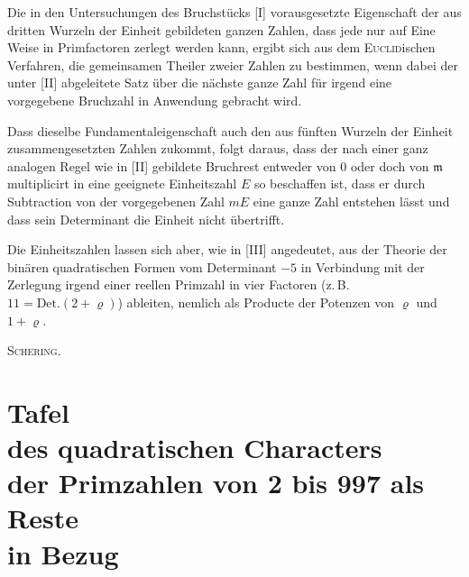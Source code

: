 \documentclass[10pt,a4paper]{article}
\begin{document}
Die in den Untersuchungen des Bruchstücks [I] vorausgesetzte Eigenschaft der aus dritten Wurzeln der Einheit gebildeten ganzen Zahlen, dass jede nur auf Eine Weise in Primfactoren zerlegt werden kann, ergibt sich aus dem \textsc{Euclid}ischen Verfahren, die gemeinsamen Theiler zweier Zahlen zu bestimmen, wenn dabei der unter [II] abgeleitete Satz über die nächste ganze Zahl für irgend eine vorgegebene Bruchzahl in Anwendung gebracht wird.

Dass dieselbe Fundamentaleigenschaft auch den aus fünften Wurzeln der Einheit zusammengesetzten Zahlen zukommt, folgt daraus, dass der nach einer ganz analogen Regel wie in [II] gebildete Bruchrest entweder von $0$ oder doch von $\mathfrak{m}$ multiplicirt in eine geeignete Einheitszahl $E$ so beschaffen ist, dass er durch Subtraction von der vorgegebenen Zahl $mE$ eine ganze Zahl entstehen lässt und dass sein Determinant die Einheit nicht übertrifft.

Die Einheitszahlen lassen sich aber, wie in [III] angedeutet, aus der Theorie der binären quadratischen Formen vom Determinant $-5$ in Verbindung mit der Zerlegung irgend einer reellen Primzahl in vier Factoren (z.\,B. $11 = \text{Det.}(2 + \varrho)$) ableiten, nemlich als Producte der Potenzen von $\varrho$ und $1 + \varrho$.

\begin{flushright}
\textsc{Schering.}
\end{flushright}

\newpage
\setcounter{page}{399}

\section*{Tafel\\des quadratischen Characters\\der Primzahlen von 2 bis 997 als Reste\\in Bezug}

\newpage
\setcounter{page}{400}

\newpage
\setcounter{page}{401}

\newpage
\setcounter{page}{402}

\newpage
\setcounter{page}{403}

\newpage
\setcounter{page}{404}

\newpage
\setcounter{page}{405}

\newpage
\setcounter{page}{406}
\end{document}
